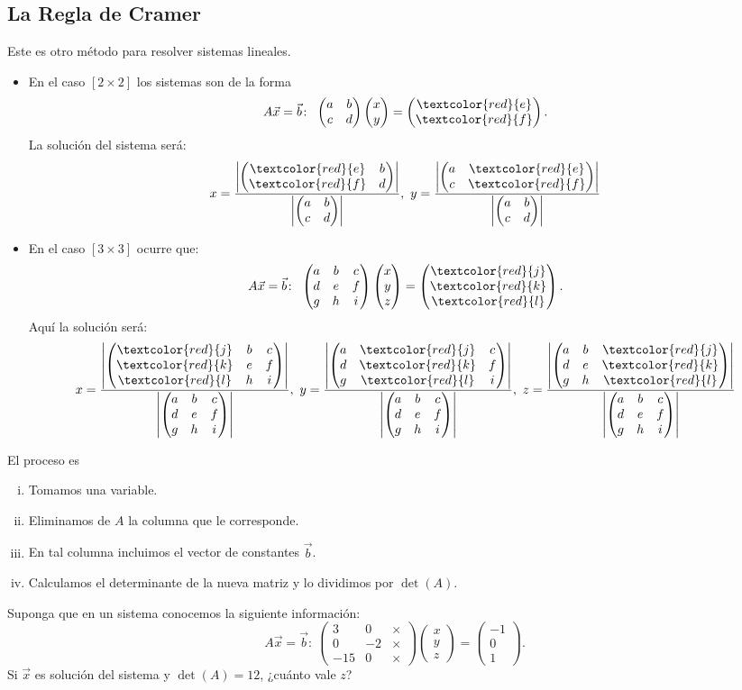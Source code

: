 \documentclass[12pt]{article}
\theoremstyle{plain}
\theoremstyle{definition}
\theoremstyle{remark}
\newcommand{\x}{\times}             %
\renewcommand{\:}{\colon}           %
\renewcommand{\.}{\Cdot}                %
\newcommand{\twobyone}[2]{\begin{pmatrix} %
  #1 \\ #2 \end{pmatrix}}
\newcommand{\twobytwo}[4]{\begin{pmatrix} %
  #1 & #2 \\ #3 & #4 \end{pmatrix}}
\newcommand{\threebyone}[3]{\begin{pmatrix} %
  #1 \\ #2 \\ #3 \end{pmatrix}}
\newcommand{\threebythree}[9]{\begin{pmatrix} %
  #1 & #2 & #3 \\ #4 & #5 & #6 \\ #7 & #8 & #9 \end{pmatrix}}
\begin{document}
\begin{multicols}{2}
\subsection*{La Regla de Cramer}
Este es otro método para resolver sistemas lineales.\par 
\begin{itemize}
  \item En el caso $[2\x2]$ los sistemas son de la forma
  $$A\vec{x}=\vec{b}\:\ \twobytwo{a}{b}{c}{d}\twobyone{x}{y}=\twobyone{\textcolor{red}{e}}{\textcolor{red}{f}}.$$
  La solución del sistema será:
  $$x=\frac{\left|\twobytwo{\textcolor{red}{e}}{b}{\textcolor{red}{f}}{d}\right|}{\left|\twobytwo{a}{b}{c}{d}\right|},\ y=\frac{\left|\twobytwo{a}{\textcolor{red}{e}}{c}{\textcolor{red}{f}}\right|}{\left|\twobytwo{a}{b}{c}{d}\right|}$$
  \item En el caso $[3\x3]$ ocurre que:
  $$A\vec{x}=\vec{b}\:\ \threebythree{a}{b}{c}{d}{e}{f}{g}{h}{i}\threebyone{x}{y}{z}=\threebyone{\textcolor{red}{j}}{\textcolor{red}{k}}{\textcolor{red}{l}}.$$
  Aquí la solución será:
  \footnotesize
  $$x=\frac{\left|\threebythree{\textcolor{red}{j}}{b}{c}{\textcolor{red}{k}}{e}{f}{\textcolor{red}{l}}{h}{i}\right|}{\left|\threebythree{a}{b}{c}{d}{e}{f}{g}{h}{i}\right|},\ y=\frac{\left|\threebythree{a}{\textcolor{red}{j}}{c}{d}{\textcolor{red}{k}}{f}{g}{\textcolor{red}{l}}{i}\right|}{\left|\threebythree{a}{b}{c}{d}{e}{f}{g}{h}{i}\right|},\ z=\frac{\left|\threebythree{a}{b}{\textcolor{red}{j}}{d}{e}{\textcolor{red}{k}}{g}{h}{\textcolor{red}{l}}\right|}{\left|\threebythree{a}{b}{c}{d}{e}{f}{g}{h}{i}\right|}$$
\end{itemize}
El proceso es 
\begin{enumerate}[i)]
  \item Tomamos una variable.
  \item Eliminamos de $A$ la columna que le corresponde.
  \item En tal columna incluimos el vector de constantes $\vec b$.
  \item Calculamos el determinante de la nueva matriz y lo dividimos por $\det(A)$.
\end{enumerate}
\begin{ptcbP}
  Suponga que en un sistema conocemos la siguiente información:
  $$A\vec x=\vec b\:\ \threebythree{3}{0}{\x}{0}{-2}{\x}{-15}{0}{\x}\threebyone{x}{y}{z}=\threebyone{-1}{0}{1}.$$
  Si $\vec{x}$ es solución del sistema y $\det(A)=12$, ¿cuánto vale $z$?
\end{ptcbP}
\end{multicols}
\end{document}
